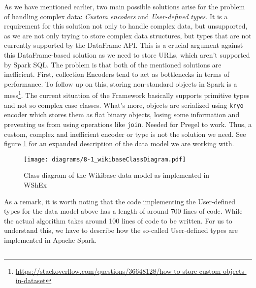 As we have mentioned earlier, two main possible solutions arise for the problem of handling complex data: \textit{Custom encoders} and \textit{User-defined types}. It is a requirement for this solution not only to handle complex data, but unsupported, as we are not only trying to store complex data structures, but types that are not currently supported by the DataFrame API. This is a crucial argument against this DataFrame-based solution as we need to store URLs, which aren't supported by Spark SQL. The problem is that both of the mentioned solutions are inefficient. First, collection Encoders tend to act as bottlenecks in terms of performance. To follow up on this, storing non-standard objects in Spark is a mess\footnote{\url{https://stackoverflow.com/questions/36648128/how-to-store-custom-objects-in-dataset}}. The current situation of the Framework basically supports primitive types and not so complex case classes. What's more, objects are serialized using \texttt{kryo} encoder which stores them as flat binary objects, losing some information and preventing us from using operations like \texttt{join}. Needed for Pregel to work. Thus, a custom, complex and inefficient encoder or type is not the solution we need. See figure \ref{fig:wikibaseClassDiagram} for an expanded description of the data model we are working with.

\begin{figure}[ht]
    \centering
    \texttt{[image: diagrams/8-1\_wikibaseClassDiagram.pdf]}
    \caption[Class diagram of the Wikibase data model as implemented in WShEx]{Class diagram of the Wikibase data model as implemented in WShEx\footnotemark}
    \label{fig:wikibaseClassDiagram}
\end{figure}

As a remark, it is worth noting that the code implementing the User-defined types for the data model above has a length of around 700 lines of code. While the actual algorithm takes around 100 lines of code to be written. For us to understand this, we have to describe how the so-called User-defined types are implemented in Apache Spark.

\begin{code}
    \inputminted{scala}{code/listings/8-1_udt.scala}
\end{code}


